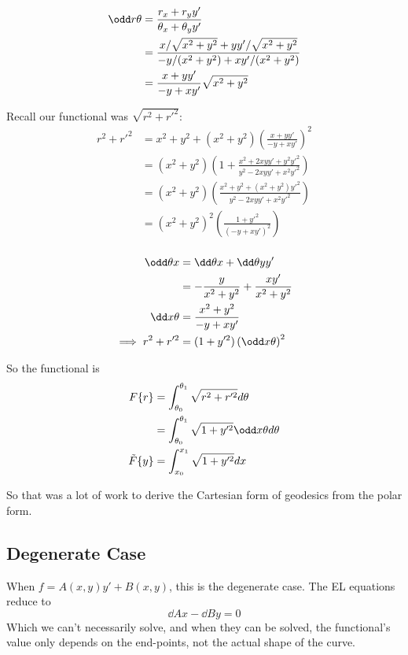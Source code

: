 \documentclass{E:/Documents/Latex/myassignment}
\begin{document}
\begin{align*}
	\odd r\theta &= \frac{r_x + r_y y'}{\theta_x + \theta_y y'} \\
	&= \frac{x/\sqrt{x^2+y^2} + y y' / \sqrt{x^2+y^2}}{-y/(x^2+y^2) + xy'/(x^2+y^2)}\\
	&= \frac{x + y y'}{- y + xy'} \sqrt{x^2+y^2}
\end{align*}

Recall our functional was $\sqrt{r^2 + r'^2}$:
\begin{align*}
	r^2 + r'^2 &= x^2 + y^2 + \left(x^2 + y^2\right)\left(\frac{x+yy'}{-y+xy'}\right)^2\\
	&= \left(x^2+y^2\right) \left(1 + \frac{x^2 + 2xyy' + y^2 y'^2}{y^2 - 2xyy' + x^2 y'^2}\right)\\
	&= \left(x^2+y^2\right) \left( \frac{x^2 +y^2 + (x^2+y^2) y'^2}{y^2 - 2xyy' + x^2 y'^2}\right)\\
	&= \left(x^2+y^2\right)^2 \left( \frac{1 + y'^2}{(-y+xy')^2}\right)\\
\end{align*}

\begin{align*}
	\odd \theta x &= \dd \theta x + \dd \theta y y'\\
	&= - \frac{y}{x^2+y^2} + \frac{xy'}{x^2+y^2}\\
	\dd x \theta &= \frac{x^2+ y^2}{-y+xy'}\\
	\implies r^2 + r'^2 &= (1+y'^2) \left(\odd x\theta\right)^2
\end{align*}

So the functional is
\begin{align*}
	F\{r\} &= \int_{\theta_0}^{\theta_1} \sqrt{r^2 + r'^2} d\theta\\
	&= \int_{\theta_0}^{\theta_1} \sqrt{1+y'^2} \odd x\theta d\theta \\
	\tilde{F}\{y\} &= \int_{x_0}^{x_1} \sqrt{1+y'^2} dx
\end{align*}

So that was a lot of work to derive the Cartesian form of geodesics from the polar form.




\subsection{Degenerate Case}
When $f = A(x,y)y' + B(x,y)$, this is the degenerate case.
The EL equations reduce to 
\[\dd Ax - \dd By = 0\]
Which we can't necessarily solve, and when they can be solved, the functional's value only depends on the end-points, not the actual shape of the curve.
\end{document}
